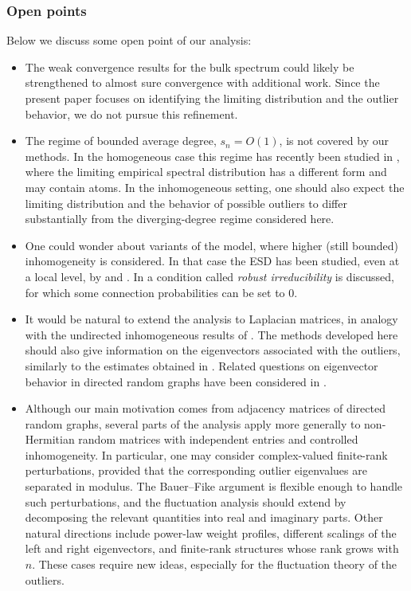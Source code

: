 \documentclass[11pt,oneside]{amsart}
\theoremstyle{plain}
\numberwithin{equation}{section}
\newcommand{\scaling}{s_n}
\begin{document}
\subsubsection*{Open points}
Below we discuss some open point of our analysis:
\begin{itemize}    
\item 
The weak convergence results for the bulk spectrum could likely be strengthened to almost sure convergence with additional work. Since the present paper focuses on identifying the limiting distribution and the outlier behavior, we do not pursue this refinement.
\item 
The regime of bounded average degree, $\scaling=O(1)$, is not covered by our methods. In the homogeneous case this regime has recently been studied in \cite{SahSahasrabudheSawhney25}, where the limiting empirical spectral distribution has a different form and may contain atoms. In the inhomogeneous setting, one should also expect the limiting distribution and the behavior of possible outliers to differ substantially from the diverging-degree regime considered here.
\item 
One could wonder about variants of the model, where higher (still bounded) inhomogeneity is considered. In that case the ESD has been studied, even at a local level, by \cite{XiYangYin-local} and \cite{AltErdosKruger}. In \cite{CookI} a condition called \textit{robust irreducibility} is discussed, for which some connection probabilities can be set to $0$.
\item It would be natural to extend the analysis to Laplacian matrices, in analogy with the undirected inhomogeneous results of \cite{CHHS}. The methods developed here should also give information on the eigenvectors associated with the outliers, similarly to the estimates obtained in \cite[Theorems 2.5 and 2.6]{CCH}. Related questions on eigenvector behavior in directed random graphs have been considered in \cite{BCH,CritErd}.
\item Although our main motivation comes from adjacency matrices of directed random graphs, several parts of the analysis apply more generally to non-Hermitian random matrices with independent entries and controlled inhomogeneity. In particular, one may consider complex-valued finite-rank perturbations, provided that the corresponding outlier eigenvalues are separated in modulus. The Bauer--Fike argument is flexible enough to handle such perturbations, and the fluctuation analysis should extend by decomposing the relevant quantities into real and imaginary parts. Other natural directions include power-law weight profiles, different scalings of the left and right eigenvectors, and finite-rank structures whose rank grows with $n$. These cases require new ideas, especially for the fluctuation theory of the outliers.
\end{itemize}
\end{document}
